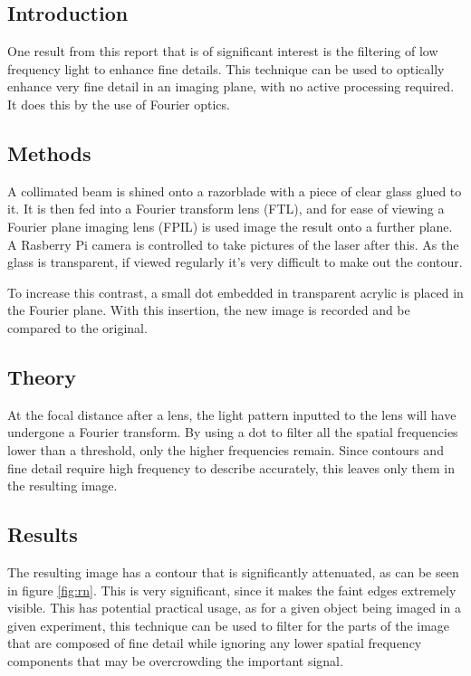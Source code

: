 \documentclass[letterpaper, reqno,11pt]{article}
\begin{document}
\subsection{Introduction}

One result from this report that is of significant interest is the filtering of low frequency light to enhance fine details. This technique can be used to optically enhance very fine detail in an imaging plane, with no active processing required. It does this by the use of Fourier optics.

\subsection{Methods}

A collimated beam is shined onto a razorblade with a piece of clear glass glued to it. It is then fed into a Fourier transform lens (FTL), and for ease of viewing a Fourier plane imaging lens (FPIL) is used image the result onto a further plane. A Rasberry Pi camera is controlled to take pictures of the laser after this. As the glass is transparent, if viewed regularly it's very difficult to make out the contour.

To increase this contrast, a small dot embedded in transparent acrylic is placed in the Fourier plane. With this insertion, the new image is recorded and be compared to the original.

\subsection{Theory}

At the focal distance after a lens, the light pattern inputted to the lens will have undergone a Fourier transform. By using a dot to filter all the spatial frequencies lower than a threshold, only the higher frequencies remain. Since contours and fine detail require high frequency to describe accurately, this leaves only them in the resulting image.

\subsection{Results}

The resulting image has a contour that is significantly attenuated, as can be seen in figure \ref{fig:rn}. This is very significant, since it makes the faint edges extremely visible. This has potential practical usage, as for a given object being imaged in a given experiment, this technique can be used to filter for the parts of the image that are composed of fine detail while ignoring any lower spatial frequency components that may be overcrowding the important signal.
\end{document}
